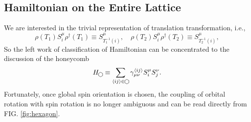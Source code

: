 \documentclass[10pt,nofootinbib]{revtex4}
\newcommand\hexagon{\mathop{\begin{tikzpicture}[scale=0.06,baseline]
		\draw (0,-1) -- (1.732,0) -- (1.732,2) -- (0,3) -- (-1.732,2) -- (-1.732,0) -- (0,-1);
	\end{tikzpicture}}}
\begin{document}
	\subsection{Hamiltonian on the Entire Lattice}
		We are interested in the trivial representation of translation transformation, i.e.,
		\begin{equation*}
			\rho(T_1)S_i^\mu\rho^\dagger(T_1)\equiv S_{T_1^{-1}(i)}^\mu,\quad \rho(T_2)S_i^\mu\rho^\dagger(T_2)\equiv S_{T_2^{-1}(i)}^\mu,
		\end{equation*}
		So the left work of classification of Hamiltonian can be concentrated to the discussion of the honeycomb
		\begin{equation}\label{2.2.1}
			H_{\hexagon}\equiv\sum_{\langle ij \rangle \in\hexagon}\gamma_{\mu\nu}^{\langle ij \rangle }S_i^\mu S_j^\nu.
		\end{equation}
		Fortunately, once global spin orientation is chosen, the coupling of orbital rotation with spin rotation is no longer ambiguous and can be read directly from FIG. \ref{fig:hexagon}.
\end{document}
